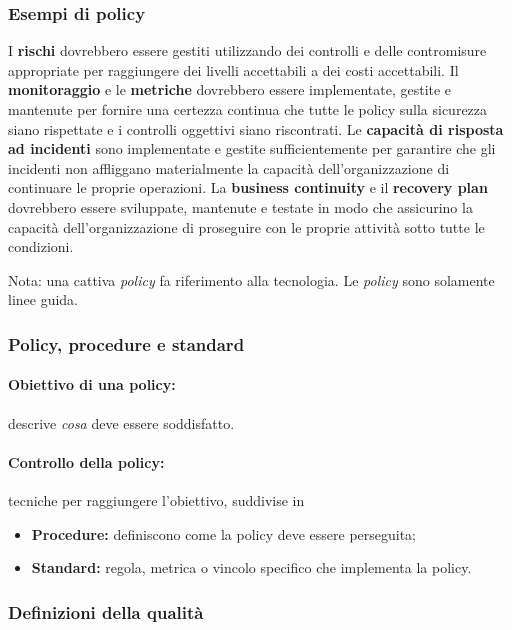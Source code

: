 \subsubsection{Esempi di policy}

I \textbf{rischi} dovrebbero essere gestiti utilizzando dei controlli e delle 
contromisure appropriate per raggiungere dei livelli accettabili a dei costi 
accettabili. Il \textbf{monitoraggio} e le \textbf{metriche} dovrebbero essere 
implementate, gestite e mantenute per fornire una certezza continua che tutte 
le policy sulla sicurezza siano rispettate e i controlli oggettivi siano 
riscontrati. Le \textbf{capacità di risposta ad incidenti} sono implementate e 
gestite sufficientemente per garantire che gli incidenti non affliggano 
materialmente la capacità dell'organizzazione di continuare le proprie 
operazioni. 
La \textbf{business continuity} e il \textbf{recovery plan} dovrebbero essere 
sviluppate, mantenute e testate in modo che assicurino la capacità 
dell'organizzazione di proseguire con le proprie attività sotto tutte le 
condizioni.


Nota: una cattiva \textit{policy} fa riferimento alla tecnologia. Le
\textit{policy} sono solamente linee guida.

\subsubsection{Policy, procedure e standard}

\paragraph*{Obiettivo di una policy:} descrive \textit{cosa} deve essere 
soddisfatto.

\paragraph*{Controllo della policy:} tecniche per raggiungere l'obiettivo, 
suddivise in
\begin{itemize}
  \item \textbf{Procedure:} definiscono come la policy deve essere perseguita;
  \item \textbf{Standard:} regola, metrica o vincolo specifico che implementa 
  la policy.
\end{itemize}

\subsubsection{Definizioni della qualità}

